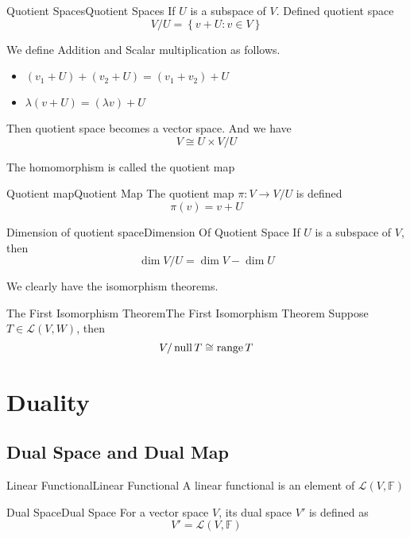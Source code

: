 \documentclass[../main.tex]{subfiles}
\begin{document}
\begin{definition}{Quotient Spaces}{Quotient Spaces}
If $U$ is a subspace of $V$. Defined quotient space
\begin{equation}
V / U = \left\{ v+U : v\in V \right\}
\end{equation}

We define Addition and Scalar multiplication as follows.
\begin{itemize}
\item $(v_1+U)+(v_2+U) = (v_1+v_2)+U$ 
\item $\lambda (v+U) = (\lambda v)+U$
\end{itemize}
Then quotient space becomes a vector space. And we have 
 \begin{equation*}
V \cong U \times V / U
\end{equation*}
\end{definition}

The homomorphism is called the quotient map
\begin{definition}{Quotient map}{Quotient Map}
The quotient map $\pi: V \rightarrow V / U$ is defined
\begin{equation*}
\pi (v) = v+U
\end{equation*}
\end{definition}

\begin{theorem}{Dimension of quotient space}{Dimension Of Quotient Space}
If $U$ is a subspace of $V$, then
\begin{equation*}
\dim V / U = \dim V-\dim U
\end{equation*}
\end{theorem}

We clearly have the isomorphism theorems.
\begin{theorem}{The First Isomorphism Theorem}{The First Isomorphism Theorem}
Suppose $T\in \mathscr{L}(V,W)$, then
\begin{equation}
V / \operatorname{null} T \cong \operatorname{range} T
\end{equation}
\end{theorem}


\section{Duality}
\subsection{Dual Space and Dual Map}
\begin{definition}{Linear Functional}{Linear Functional}
A linear functional is an element of $\mathscr{L}(V,\mathbb{F})$
\end{definition}
\begin{definition}{Dual Space}{Dual Space}
For a vector space $V$, its dual space $V'$ is defined as 
\begin{equation*}
V' = \mathscr{L}(V,\mathbb{F})
\end{equation*}
\end{definition}
\end{document}
